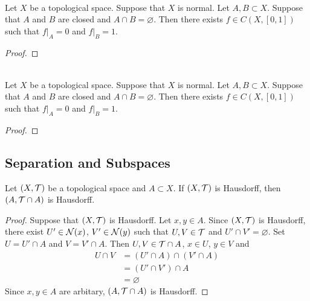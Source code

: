 \documentclass{book}
\begin{document}
	\begin{ex}  \\
		Let $X$ be a topological space. Suppose that $X$ is normal. Let $A,B \subset X$. Suppose that $A$ and $B$ are closed and $A \cap B = \varnothing$. Then there exists $f \in C(X, [0,1])$ such that $f|_A = 0$ and $f|_B = 1$. 
	\end{ex}

	\begin{proof}
	\end{proof}

	\begin{ex}  \\
		Let $X$ be a topological space. Suppose that $X$ is normal. Let $A,B \subset X$. Suppose that $A$ and $B$ are closed and $A \cap B = \varnothing$. Then there exists $f \in C(X, [0,1])$ such that $f|_A = 0$ and $f|_B = 1$. 
	\end{ex}
	
	\begin{proof}
	\end{proof}






























	\subsection{Separation and Subspaces}
	
	\begin{ex}
		Let $(X, \mathcal{T})$ be a topological space and $A \subset X$. If $(X, \mathcal{T})$ is Hausdorff, then $(A, \mathcal{T} \cap A)$ is Hausdorff.
	\end{ex}
	
	\begin{proof}
		Suppose that $(X, \mathcal{T})$ is Hausdorff. Let $x, y \in A$. Since $(X, \mathcal{T})$ is Hausdorff, there exist $U' \in \mathcal{N}(x)$, $V' \in \mathcal{N}(y)$ such that $U,V \in \mathcal{T}$ and $U' \cap V' = \varnothing$. Set $U = U' \cap A$ and $V = V' \cap A$. Then $U, V \in \mathcal{T} \cap A$, $x \in U$, $y \in V$ and 
		\begin{align*}
			U \cap V
			& = (U' \cap A) \cap (V' \cap A) \\
			& = (U' \cap V') \cap A \\
			& = \varnothing
		\end{align*}
		Since $x,y \in A$ are arbitary, $(A, \mathcal{T} \cap A)$ is Hausdorff.
	\end{proof}
\end{document}
